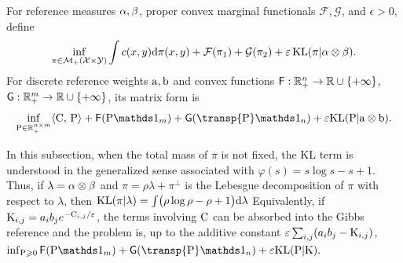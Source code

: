 \begin{defn}\label{def-marginal-dependent-entropic-transport}
For reference measures \(\alpha,\beta\), proper convex marginal functionals \(\mathcal F,\mathcal G\), and \(\epsilon>0\), define
\begin{equation}\label{eq-marginal-dependent-cont}
\inf_{\pi\in\mathcal{M}_+(\mathcal{X}\times\mathcal{Y})}
\int c(x,y)\mathrm{d}\pi(x,y)
+
\mathcal F(\pi_1)
+
\mathcal G(\pi_2)
+
\varepsilon\operatorname{KL}(\pi|\alpha\otimes\beta).
\end{equation}
For discrete reference weights \(\mathrm{a},\mathrm{b}\) and convex functions
\(\mathsf F:\mathbb{R}_+^n\to\mathbb{R}\cup\{+\infty\}\),
\(\mathsf G:\mathbb{R}_+^m\to\mathbb{R}\cup\{+\infty\}\), its matrix form is
\begin{equation}\label{eq-marginal-dependent-discrete}
\inf_{\P\in\RR_+^{n\times m}}
\dotp{\C}{\P}
+
\mathsf F(\P\ones_m)
+
\mathsf G(\transp{\P}\ones_n)
+
\epsilon\KLD(\P|\a\otimes\b).
\end{equation}
\end{defn}
In this subsection, when the total mass of $\pi$ is not fixed, the KL term is understood in the generalized sense associated with $\varphi(s)=s\log s-s+1$. Thus, if $\lambda=\alpha\otimes\beta$ and $\pi=\rho\lambda+\pi^\perp$ is the Lebesgue decomposition of $\pi$ with respect to $\lambda$, then
\(\operatorname{KL}(\pi|\lambda) = \int \bigl(\rho\log\rho-\rho+1\bigr)\mathrm{d}\lambda\)
Equivalently, if $\mathrm{K}_{i,j}=a_i b_j e^{-\mathrm{C}_{i,j}/\varepsilon}$, the terms involving $\mathrm{C}$ can be absorbed into the Gibbs reference and the problem is, up to the additive constant $\varepsilon\sum_{i,j}(a_i b_j-\mathrm{K}_{i,j})$,
\(\inf_{\P\geq0} \mathsf F(\P\ones_m) + \mathsf G(\transp{\P}\ones_n) + \epsilon\KLD(\P|\K).\)
